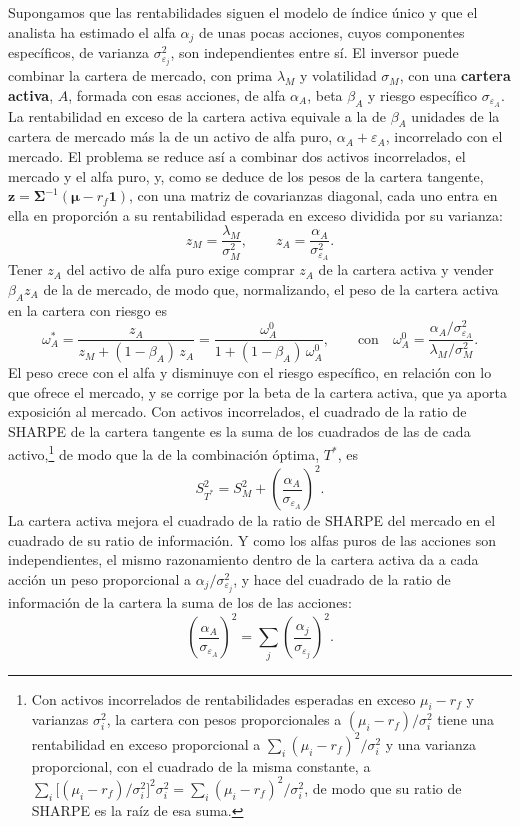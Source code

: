 \documentclass[10pt,a4paper]{article}
\begin{document}
Supongamos que las rentabilidades siguen el modelo de índice único y que el analista ha estimado el alfa $\alpha_j$ de unas pocas acciones, cuyos componentes específicos, de varianza $\sigma^2_{\varepsilon_j}$, son independientes entre sí. El inversor puede combinar la cartera de mercado, con prima $\lambda_M$ y volatilidad $\sigma_M$, con una \textbf{cartera activa}, $A$, formada con esas acciones, de alfa $\alpha_A$, beta $\beta_A$ y riesgo específico $\sigma_{\varepsilon_A}$. La rentabilidad en exceso de la cartera activa equivale a la de $\beta_A$ unidades de la cartera de mercado más la de un activo de alfa puro, $\alpha_A+\varepsilon_A$, incorrelado con el mercado. El problema se reduce así a combinar dos activos incorrelados, el mercado y el alfa puro, y, como se deduce de los pesos de la cartera tangente, $\mathbf z=\boldsymbol\Sigma^{-1}(\boldsymbol\mu-r_f\mathbf 1)$, con una matriz de covarianzas diagonal, cada uno entra en ella en proporción a su rentabilidad esperada en exceso dividida por su varianza:
$$z_M=\frac{\lambda_M}{\sigma_M^2},\qquad z_A=\frac{\alpha_A}{\sigma^2_{\varepsilon_A}}.$$
Tener $z_A$ del activo de alfa puro exige comprar $z_A$ de la cartera activa y vender $\beta_Az_A$ de la de mercado, de modo que, normalizando, el peso de la cartera activa en la cartera con riesgo es
$$\omega_A^*=\frac{z_A}{z_M+(1-\beta_A)\,z_A}=\frac{\omega_A^0}{1+(1-\beta_A)\,\omega_A^0},\qquad\text{con}\quad\omega_A^0=\frac{\alpha_A/\sigma^2_{\varepsilon_A}}{\lambda_M/\sigma_M^2}.$$
El peso crece con el alfa y disminuye con el riesgo específico, en relación con lo que ofrece el mercado, y se corrige por la beta de la cartera activa, que ya aporta exposición al mercado. Con activos incorrelados, el cuadrado de la ratio de SHARPE de la cartera tangente es la suma de los cuadrados de las de cada activo,\footnote{%
    Con activos incorrelados de rentabilidades esperadas en exceso $\mu_i-r_f$ y varianzas $\sigma_i^2$, la cartera con pesos proporcionales a $(\mu_i-r_f)/\sigma_i^2$ tiene una rentabilidad en exceso proporcional a $\sum_i(\mu_i-r_f)^2/\sigma_i^2$ y una varianza proporcional, con el cuadrado de la misma constante, a $\sum_i\big[(\mu_i-r_f)/\sigma_i^2\big]^2\sigma_i^2=\sum_i(\mu_i-r_f)^2/\sigma_i^2$, de modo que su ratio de SHARPE es la raíz de esa suma.
} de modo que la de la combinación óptima, $T^*$, es
$$S_{T^*}^2=S_M^2+\left(\frac{\alpha_A}{\sigma_{\varepsilon_A}}\right)^2.$$
La cartera activa mejora el cuadrado de la ratio de SHARPE del mercado en el cuadrado de su ratio de información. Y como los alfas puros de las acciones son independientes, el mismo razonamiento dentro de la cartera activa da a cada acción un peso proporcional a $\alpha_j/\sigma^2_{\varepsilon_j}$, y hace del cuadrado de la ratio de información de la cartera la suma de los de las acciones:
$$\left(\frac{\alpha_A}{\sigma_{\varepsilon_A}}\right)^2=\sum_j\left(\frac{\alpha_j}{\sigma_{\varepsilon_j}}\right)^2.$$
\end{document}
